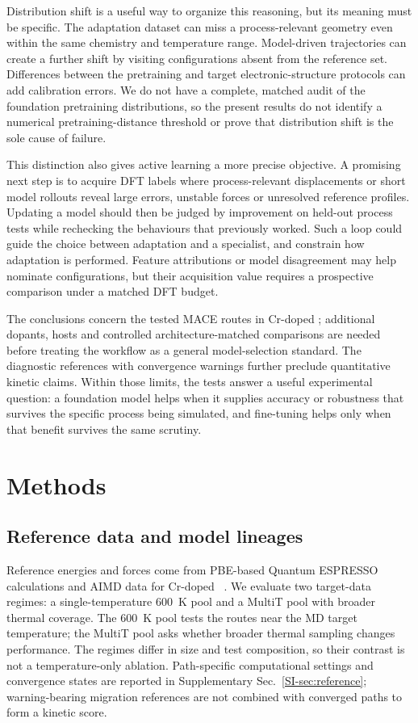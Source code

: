 \documentclass[pdflatex,sn-mathphys-num]{sn-jnl}
\newif\ifreviewcopy
\newcommand{\rev}[2]{\ifreviewcopy{\color{revisionblue}#2\textsuperscript{\scriptsize[R1-#1]}}\else#2\fi}
\begin{document}
Distribution shift is a useful way to organize this reasoning, but its meaning must be specific. The adaptation dataset can miss a process-relevant geometry even within the same chemistry and temperature range. Model-driven trajectories can create a further shift by visiting configurations absent from the reference set. Differences between the pretraining and target electronic-structure protocols can add calibration errors. We do not have a complete, matched audit of the foundation pretraining distributions, so the present results do not identify a numerical pretraining-distance threshold or prove that distribution shift is the sole cause of failure.

This distinction also gives active learning a more precise objective. A promising next step is to acquire DFT labels where process-relevant displacements or short model rollouts reveal large errors, unstable forces or unresolved reference profiles. Updating a model should then be judged by improvement on held-out process tests while rechecking the behaviours that previously worked. Such a loop could guide the choice between adaptation and a specialist, and constrain how adaptation is performed. Feature attributions or model disagreement may help nominate configurations, but their acquisition value requires a prospective comparison under a matched DFT budget.

\rev{A4}{The conclusions concern the tested MACE routes in Cr-doped \ce{Sb2Te3}; additional dopants, hosts and controlled architecture-matched comparisons are needed before treating the workflow as a general model-selection standard.} The diagnostic references with convergence warnings further preclude quantitative kinetic claims. Within those limits, the tests answer a useful experimental question: a foundation model helps when it supplies accuracy or robustness that survives the specific process being simulated, and fine-tuning helps only when that benefit survives the same scrutiny.

\section{Methods}\label{sec:methods}
\subsection{Reference data and model lineages}\label{sec:models}
Reference energies and forces come from PBE-based Quantum ESPRESSO calculations and AIMD data for Cr-doped ~\citep{giannozzi2009quantum,perdew1996generalized}. We evaluate two target-data regimes: a single-temperature 600~K pool and a MultiT pool with broader thermal coverage. The 600~K pool tests the routes near the MD target temperature; the MultiT pool asks whether broader thermal sampling changes performance. The regimes differ in size and test composition, so their contrast is not a temperature-only ablation. Path-specific computational settings and convergence states are reported in Supplementary Sec.~\ref{SI-sec:reference}; warning-bearing migration references are not combined with converged paths to form a kinetic score.
\end{document}
